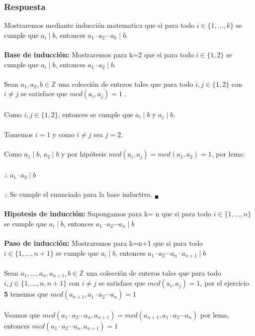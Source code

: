\documentclass[12pt]{article}
\begin{document}
	\subsubsection*{Respuesta}
	Mostraremos mediante inducción matematica que si para todo $i \in \{1, \dots, k \}$ se cumple que $a_i \mid b$, entonces $a_1 \cdot a_2 \cdots a_k \mid b$.\\
	\\
	\textbf{Base de inducción:} Mostraremos para k=2 que si para todo $i \in \{1,2\}$ se cumple que $a_i \mid b$, entonces $a_1 \cdot a_2 \mid b$.\\\\ 
	Sean $a_1, a_2, b \in \mathbb{Z}$ una colección de enteros tales que para todo $i, j \in \{1, 2\}$ con $i \neq j$ se satisface que $mcd(a_i, a_j ) = 1$ .\\\\
	Como $i, j \in \{1,2\}$, entonces se cumple que $a_i\mid b$ y $a_j \mid b$.\\\\
	Tomemos $i=1$ y como $i \neq j$ sea $j=2$.\\\\
	Como $a_1 \mid b$, $a_2 \mid b$ y por hipótesis  $mcd(a_i, a_j ) = mcd(a_1,a_2)= 1$, por lema:\\\\
	$\therefore$ $a_1 \cdot a_2 \mid b $\\\\
	$\therefore$ Se cumple el enunciado para la base inductiva. $ _{\blacksquare }$\\\\
	\textbf{Hipotesis de inducción:} Supongamos para k= n que si para todo $i \in \{1, \dots, n \}$ se cumple que $a_i \mid b$, entonces $a_1 \cdot a_2 \cdots a_n \mid b$\\\\
	\textbf{Paso de inducción:} Mostraremos para k=n+1 que si para todo $i \in \{1, \dots, n+1 \}$ se cumple que $a_i \mid b$, entonces $a_1 \cdot a_2 \cdots a_n \cdot a_{n + 1} \mid b$\\\\
	Sean $a_1, \dots, a_n, a_{n+1}, b \in \mathbb{Z}$ una colección de enteros tales que para todo $i, j \in \{1, ...,n, n+1\}$ con $i \neq j$ se satisface que $mcd(a_i, a_j ) = 1$, por el ejercicio \textbf{5} tenemos que $mcd(a_{n+1}, a_1 \cdot a_2 \cdots a_n) = 1$\\\\
	Veamos que $mcd (a_1 \cdot a_2 \cdots a_n, a_{n+1})=mcd(a_{n+1}, a_1 \cdot a_2 \cdots a_n)$ por lema, entonces $mcd (a_1 \cdot a_2 \cdots a_n, a_{n+1})= 1$ \\\\
\end{document}
